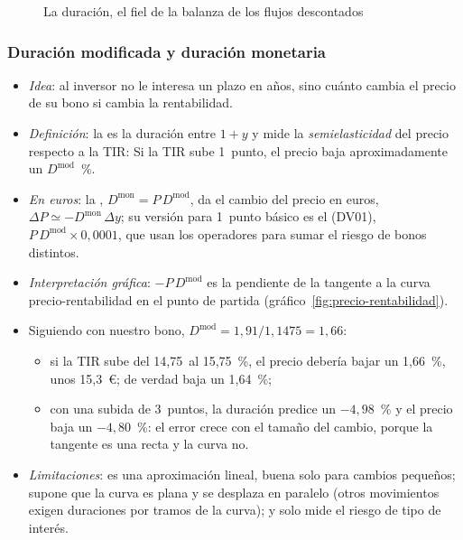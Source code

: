 \documentclass[11pt]{article}
\begin{document}
\begin{figure}[H]
\centering
\caption{La duración, el fiel de la balanza de los flujos descontados}\label{fig:balanza-duracion}
\end{figure}

\subsubsection{Duración modificada y duración monetaria}\label{sec:duracion-modificada}

\begin{itemize}
\item \emph{Idea}: al inversor no le interesa un plazo en años, sino cuánto cambia el precio de su bono si cambia la rentabilidad.
\item \emph{Definición}: la  es la duración entre $1+y$ y mide la \emph{semielasticidad} del precio respecto a la TIR:
  Si la TIR sube 1~punto, el precio baja aproximadamente un $D^{\mathrm{mod}}$~\%.
\item \emph{En euros}: la , $D^{\mathrm{mon}}=P\,D^{\mathrm{mod}}$, da el cambio del precio en euros, $\Delta P\simeq-D^{\mathrm{mon}}\,\Delta y$; su versión para 1~punto básico es el  (DV01), $P\,D^{\mathrm{mod}}\times0{,}0001$, que usan los operadores para sumar el riesgo de bonos distintos\nocite{Fabozzi2021Bond}.
\item \emph{Interpretación gráfica}: $-P\,D^{\mathrm{mod}}$ es la pendiente de la tangente a la curva precio-rentabilidad en el punto de partida (gráfico~\ref{fig:precio-rentabilidad}).
\item Siguiendo con nuestro bono, $D^{\mathrm{mod}}=1{,}91/1{,}1475=1{,}66$:
  \begin{itemize}
  \item si la TIR sube del 14,75~al 15,75~\%, el precio debería bajar un 1,66~\%, unos 15,3~€; de verdad baja un 1,64~\%;
  \item con una subida de 3~puntos, la duración predice un $-4{,}98$~\% y el precio baja un $-4{,}80$~\%: el error crece con el tamaño del cambio, porque la tangente es una recta y la curva no.
  \end{itemize}
\item \emph{Limitaciones}: es una aproximación lineal, buena solo para cambios pequeños; supone que la curva es plana y se desplaza en paralelo (otros movimientos exigen duraciones por tramos de la curva); y solo mide el riesgo de tipo de interés.
\end{itemize}
\end{document}
